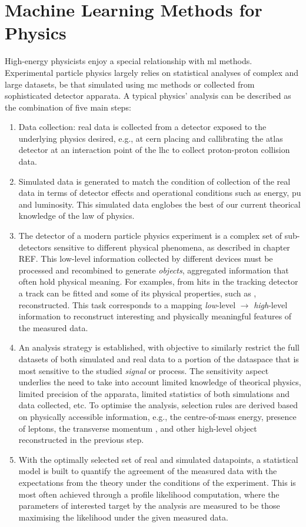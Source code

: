 \section{Machine Learning Methods for Physics}
High-energy physicists enjoy a special relationship with \gls{ml} methods. Experimental particle physics largely relies on statistical analyses of complex and large datasets, be that simulated using \gls{mc} methods or collected from sophisticated detector apparata. A typical physics' analysis can be described as the combination of five main steps:
\begin{enumerate}
    \item Data collection: real data is collected from a detector exposed to the underlying physics desired, e.g., at \gls{cern} placing and callibrating the \gls{atlas} detector at an interaction point of the \gls{lhc} to collect proton-proton collision data. 
    \item Simulated data is generated to match the condition of collection of the real data in terms of detector effects and operational conditions such as energy, \gls{pu} and luminosity. This simulated data englobes the best of our current theorical knowledge of the law of physics. 
    \item The detector of a modern particle physics experiment is a complex set of sub-detectors sensitive to different physical phenomena, as described in chapter REF. %
    This low-level information collected by different devices must be processed and recombined to generate \textit{objects}, aggregated information that often hold physical meaning. For examples, from hits in the tracking detector a track can be fitted and some of its physical properties, such as \pt, reconstructed. This task corresponds to a mapping \textit{low}-level $\rightarrow$ \textit{high}-level information to reconstruct interesting and physically meaningful features of the measured data. 
    \item An analysis strategy is established, with objective to similarly restrict the full datasets of both simulated and real data to a portion of the dataspace that is most sensitive to the studied \textit{signal} or process. The sensitivity aspect underlies the need to take into account limited knowledge of theorical physics, limited precision of the apparata, limited statistics of both simulations and data collected, etc. To optimise the analysis, selection rules are derived based on physically accessible information, e.g., the centre-of-mass energy, presence of leptons, the transverse momentum \pt, and other high-level object reconstructed in the previous step.
    \item With the optimally selected set of real and simulated datapoints, a statistical model is built to quantify the agreement of the measured data with the expectations from the theory under the conditions of the experiment. This is most often achieved through a profile likelihood computation, where the parameters of interested target by the analysis are measured to be those maximising the likelihood under the given measured data.
\end{enumerate}

